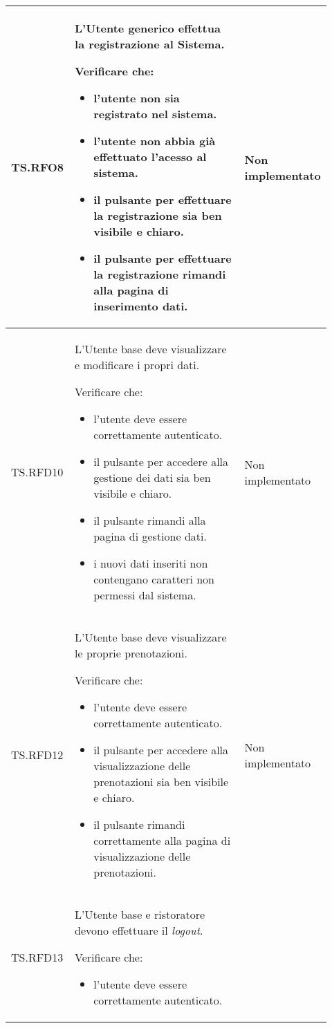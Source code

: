 \begin{longtable}{|p{0.12\linewidth}|p{0.58\linewidth}|p{0.22\linewidth}|}
    \hline
    TS.RFO8 & 
    L'Utente generico effettua la registrazione al Sistema. \par 
    Verificare che: 
    \begin{itemize}
        \item l'utente non sia registrato nel sistema.
        \item l'utente non abbia già effettuato l'acesso al sistema.
        \item il pulsante per effettuare la registrazione sia ben visibile e chiaro.
        \item il pulsante per effettuare la registrazione rimandi alla pagina di inserimento dati.
    \end{itemize}&
    Non implementato \\
    \hline
    TS.RFD10 & 
    L'Utente base deve visualizzare e modificare i propri dati. \par 
    Verificare che: 
    \begin{itemize}
        \item l'utente deve essere correttamente autenticato.
        \item il pulsante per accedere alla gestione dei dati sia ben visibile e chiaro.
        \item il pulsante rimandi alla pagina di gestione dati.
        \item i nuovi dati inseriti non contengano caratteri non permessi dal sistema.
    \end{itemize}&
    Non implementato \\
    \hline
    TS.RFD12 & 
    L'Utente base deve visualizzare le proprie prenotazioni. \par 
    Verificare che: 
    \begin{itemize}
        \item l'utente deve essere correttamente autenticato.
        \item il pulsante per accedere alla visualizzazione delle prenotazioni sia ben visibile e chiaro.
        \item il pulsante rimandi correttamente alla pagina di visualizzazione delle prenotazioni.
    \end{itemize}&
    Non implementato \\
    \hline
    TS.RFD13 & 
    L'Utente base e ristoratore devono effettuare il \textit{logout}. \par 
    Verificare che: 
    \begin{itemize}
        \item l'utente deve essere correttamente autenticato.

\end{itemize}
\end{longtable}
